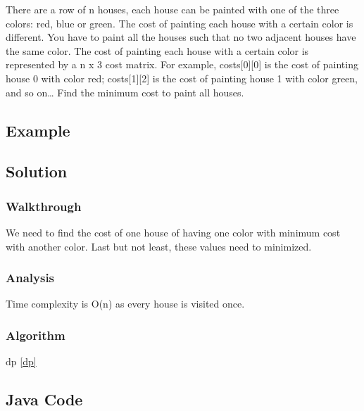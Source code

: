 \documentclass[]{book}
\begin{document}
There are a row of n houses, each house can be painted with one of the three colors: red, blue or green. The cost of
painting each house with a certain color is different. You have to paint all the houses such that no two adjacent
houses have the same color. The cost of painting each house with a certain color is represented by a n x 3 cost
matrix. For example, costs{[}0{]}{[}0{]} is the cost of painting house 0 with color red; costs{[}1{]}{[}2{]} is the cost of painting
house 1 with color green, and so on\ldots{} Find the minimum cost to paint all houses.

\hypertarget{example-29}{%
\subsection{Example}\label{example-29}}

\hypertarget{solution-23}{%
\subsection{Solution}\label{solution-23}}

\hypertarget{walkthrough-29}{%
\subsubsection{Walkthrough}\label{walkthrough-29}}

We need to find the cost of one house of having one color with minimum cost with another color. Last but not least,
these values need to minimized.

\hypertarget{analysis-32}{%
\subsubsection{Analysis}\label{analysis-32}}

Time complexity is O(n) as every house is visited once.

\hypertarget{algorithm-32}{%
\subsubsection{Algorithm}\label{algorithm-32}}

dp \ref{dp}

\hypertarget{java-code-26}{%
\subsection{Java Code}\label{java-code-26}}
\end{document}
